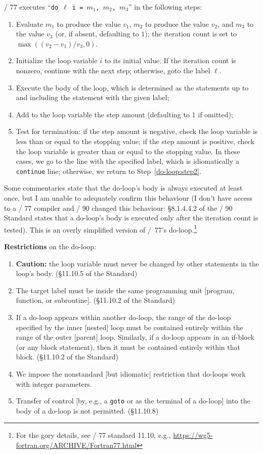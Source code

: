 \FORTRAN/ 77 executes ``\texttt{do $\ell$ i = $m_{1}$, $m_{2}$, $m_{3}$}''
in the following steps:
\begin{enumerate}
\item Evaluate $m_{1}$ to produce the value $v_{1}$, $m_{2}$ to produce
  the value $v_{2}$, and $m_{3}$ to the value $v_{3}$ (or, if absent,
  defaulting to $1$); the iteration
  count is set to $\max((v_{2}-v_{1})/v_{3}, 0)$.
\item Initialize the loop variable $i$ to its initial value. If the
  iteration count is nonzero, continue with the next step; otherwise,
  goto the label $\ell$.
\item\label{do-loop:step2} Execute the body of the loop, which is
  determined as the statements up to and including the statement with
  the given label;
\item Add to the loop variable the step amount (defaulting to 1 if omitted);
\item Test for termination: if the step amount is negative, check the
  loop variable is less than or equal to the stopping value; if the step
  amount is positive, check the loop variable is greater than or equal
  to the stopping value. In these cases, we go to the line with the
  specified label, which is idiomatically a \texttt{continue} line;
  otherwise, we return to Step~\ref{do-loop:step2}.
\end{enumerate}
Some commentaries state that the do-loop's body is always executed at least
once, but I am unable to adequately confirm this behaviour (I don't have
access to a \FORTRAN/ 77 compiler and \FORTRAN/ 90 changed this
behaviour: \S8.1.4.4.2 of the \FORTRAN/
90 Standard states that a do-loop's body is executed only after the
iteration count is tested).
This is an overly simplified version of \FORTRAN/~77's
do-loop.\footnote{For the gory details, see \FORTRAN/ 77 standard 11.10,
e.g., \url{https://wg5-fortran.org/ARCHIVE/Fortran77.html}}

\textbf{Restrictions} on the do-loop:
\begin{enumerate}
\item \textbf{Caution:} the loop variable must never be changed by other
statements in the loop's body. (\S11.10.5 of the Standard)
\item The target label must be inside the same programming unit
  [program, function, or subroutine]. (\S11.10.2 of the Standard)
\item If a do-loop appears within another do-loop, the range of the
  do-loop specified by the inner [nested] loop must be contained
  entirely within the range of the outer [parent] loop. Similarly, if a
  do-loop appears in an if-block (or any block statement), then it must
  be contained entirely within that block. (\S11.10.2 of the Standard)
\item We impose the nonstandard [but idiomatic] restriction that
  do-loops work with integer parameters.
\item Transfer of control [by, e.g., a \texttt{goto} or as the terminal
  of a do-loop] into the body of a do-loop is not permitted. (\S11.10.8)
\end{enumerate}

